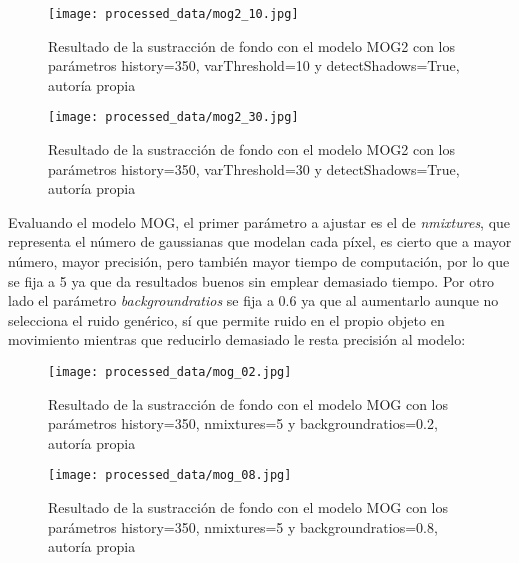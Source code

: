 \documentclass[a4paper,12pt]{article}
\begin{document}
{\begin{figure}[h!]
    \centering
    \begin{minipage}[t]{0.45\textwidth}
        \centering
        \texttt{[image: processed\_data/mog2\_10.jpg]}
        \caption{Resultado de la sustracción de fondo con el modelo MOG2 con los parámetros history=350, varThreshold=10 y detectShadows=True, autoría propia}
        \label{fig:mog2-10}
    \end{minipage}
    \hfill
    \begin{minipage}[t]{0.45\textwidth}
        \centering
        \texttt{[image: processed\_data/mog2\_30.jpg]}
        \caption{Resultado de la sustracción de fondo con el modelo MOG2 con los parámetros history=350, varThreshold=30 y detectShadows=True, autoría propia}
        \label{fig:mog2-30}
    \end{minipage}
\end{figure}

\vspace{0.5cm}

Evaluando el modelo MOG, el primer parámetro a ajustar es el de \textit{nmixtures}, que representa el número de gaussianas que modelan cada píxel, es cierto que a mayor número,
mayor precisión, pero también mayor tiempo de computación, por lo que se fija a 5 ya que da resultados buenos sin emplear demasiado tiempo. Por otro lado el parámetro \textit{backgroundratios}
se fija a 0.6 ya que al aumentarlo aunque no selecciona el ruido genérico, sí que permite ruido en el propio objeto en movimiento mientras que reducirlo demasiado le resta precisión al modelo:

\vspace{0.5cm}

\begin{figure}[h!]
    \centering
    \begin{minipage}[t]{0.45\textwidth}
        \centering
        \texttt{[image: processed\_data/mog\_02.jpg]}
        \caption{Resultado de la sustracción de fondo con el modelo MOG con los parámetros history=350, nmixtures=5 y backgroundratios=0.2, autoría propia}
        \label{fig:mog-02}
    \end{minipage}
    \hfill
    \begin{minipage}[t]{0.45\textwidth}
        \centering
        \texttt{[image: processed\_data/mog\_08.jpg]}
        \caption{Resultado de la sustracción de fondo con el modelo MOG con los parámetros history=350, nmixtures=5 y backgroundratios=0.8, autoría propia}
        \label{fig:mog-08}
    \end{minipage}
\end{figure}

}
\end{document}
